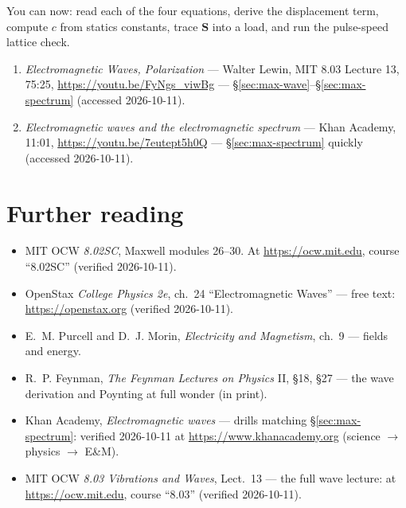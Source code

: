 \begin{wins}
You can now: read each of the four equations, derive the displacement
term, compute $c$ from statics constants, trace $\mathbf S$ into a
load, and run the pulse-speed lattice check.
\end{wins}


\begin{rulebox}
\begin{enumerate}
\item \emph{Electromagnetic Waves, Polarization} --- Walter Lewin,
MIT 8.03 Lecture 13, 75:25, \url{https://youtu.be/FyNgs_viwBg} ---
\S\ref{sec:max-wave}--\S\ref{sec:max-spectrum} (accessed 2026-10-11).
\item \emph{Electromagnetic waves and the electromagnetic spectrum} ---
Khan Academy, 11:01, \url{https://youtu.be/7eutept5h0Q} ---
\S\ref{sec:max-spectrum} quickly (accessed 2026-10-11).
\end{enumerate}
\end{rulebox}

\section*{Further reading}

\begin{itemize}
\item MIT OCW \emph{8.02SC}, Maxwell modules 26--30. At
\url{https://ocw.mit.edu}, course ``8.02SC'' (verified 2026-10-11).
\item OpenStax \emph{College Physics 2e}, ch.~24 ``Electromagnetic
Waves'' --- free text: \url{https://openstax.org} (verified 2026-10-11).
\item E.~M. Purcell and D.~J. Morin, \emph{Electricity and Magnetism},
ch.~9 --- fields and energy.
\item R.~P. Feynman, \emph{The Feynman Lectures on Physics} II,
\S18, \S27 --- the wave derivation and Poynting at full wonder (in
print).
\item Khan Academy, \emph{Electromagnetic waves} --- drills matching
\S\ref{sec:max-spectrum}: verified 2026-10-11 at
\url{https://www.khanacademy.org} (science $\to$ physics $\to$ E\&M).
\item MIT OCW \emph{8.03 Vibrations and Waves}, Lect.~13 ---
the full wave lecture: at \url{https://ocw.mit.edu}, course ``8.03''
(verified 2026-10-11).
\end{itemize}

